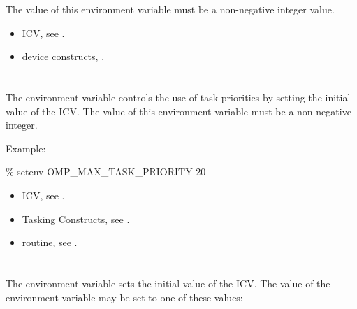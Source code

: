 The value of this environment variable must be a non-negative integer value.

\crossreferences
\begin{itemize}
\item {} ICV, see .

\item device constructs, .
\end{itemize}


\section{}
\label{sec:OMP_MAX_TASK_PRIORITY}

The  environment variable controls the use of task
priorities by setting the initial value of the  ICV. The
value of this environment variable must be a non-negative integer. 

Example:
\begin{boxedcode}
\% setenv OMP\_MAX\_TASK\_PRIORITY 20
\end{boxedcode}

\crossreferences
\begin{itemize}
\item {} ICV, see .
\item Tasking Constructs, see .
\item {} routine, see .
\end{itemize}






\section{}
\label{sec:OMP_TARGET_OFFLOAD}
%
The  environment variable sets the initial value of the  ICV.
The value of the  environment variable may be set to one of these 
values:


